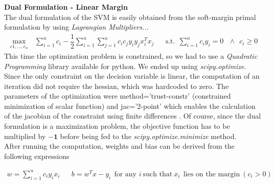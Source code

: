 \documentclass[12pt]{article}
\begin{document}
	\textbf{Dual Formulation - Linear Margin}\\
	The dual formulation of the SVM is easily obtained from the soft-margin primal formulation by using \textit{Lagrangian Multipliers...}
	\begin{align}
		\max_{c1,\dots, c_n}\ \ \ \sum_{i=1}^n{c_i} - \dfrac 1 2 \sum_{i=1}^n{\sum_{j=1}^n{c_i c_j y_i y_j x_i^Tx_j}} &&
		\nonumber \text{s.t.} \ \ \sum_{i=1}^n{c_iy_i} = 0\ \ \ \land \ \ c_i \ge 0
	\end{align}
	This time the optimization problem is constrained, so we had to use a \textit{Quadratic Programming} library available for python. We ended up using \textit{scipy.optimize}. Since the only constraint on the decision variable is linear, the computation of an iteration did not require the hessian, which was hardcoded to zero. The parameters of the optimization were method='trust-constr' (constrained minimization of scalar function) and jac='2-point' which enables the calculation of the jacobian of the constraint using finite differences \cite{docscipyopt}. Of course, since the dual formulation is a maximization problem, the objective function has to be multiplied by $\mathbf{-1}$ before being fed to the \textit{scipy.optimize.minimize} method.\\
	
	After running the computation, weights and bias can be derived from the following expressions
	
	\begin{align}
		w = \sum_{i=1}^n{c_iy_ix_i}&&
		b = w^Tx-y_i \ \ \text{for any } i\ \text{such that}\ x_i\ \ \text{lies on the margin}\  (c_i>0)
	\end{align}
	
\end{document}
